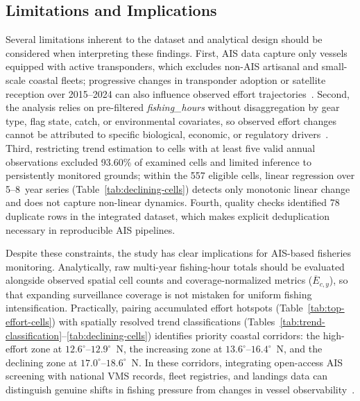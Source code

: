 \documentclass[pdflatex,sn-mathphys-num]{sn-jnl}
\theoremstyle{thmstyleone}
\theoremstyle{thmstyletwo}
\theoremstyle{thmstylethree}
\begin{document}
\subsection{Limitations and Implications}\label{subsec:disc-limitations}

Several limitations inherent to the dataset and analytical design should be considered when interpreting these findings. First, AIS data capture only vessels equipped with active transponders, which excludes non-AIS artisanal and small-scale coastal fleets; progressive changes in transponder adoption or satellite reception over 2015--2024 can also influence observed effort trajectories~\cite{taconet2019,murua2019,russo2016,gfw2025}. Second, the analysis relies on pre-filtered \textit{fishing\_hours} without disaggregation by gear type, flag state, catch, or environmental covariates, so observed effort changes cannot be attributed to specific biological, economic, or regulatory drivers~\cite{natale2015,guiet2019,taconet2019}. Third, restricting trend estimation to cells with at least five valid annual observations excluded 93.60\% of examined cells and limited inference to persistently monitored grounds; within the 557 eligible cells, linear regression over 5--8~year series (Table~\ref{tab:declining-cells}) detects only monotonic linear change and does not capture non-linear dynamics. Fourth, quality checks identified 78 duplicate rows in the integrated dataset, which makes explicit deduplication necessary in reproducible AIS pipelines.

Despite these constraints, the study has clear implications for AIS-based fisheries monitoring. Analytically, raw multi-year fishing-hour totals should be evaluated alongside observed spatial cell counts and coverage-normalized metrics ($\overline{E}_{c,y}$), so that expanding surveillance coverage is not mistaken for uniform fishing intensification. Practically, pairing accumulated effort hotspots (Table~\ref{tab:top-effort-cells}) with spatially resolved trend classifications (Tables~\ref{tab:trend-classification}--\ref{tab:declining-cells}) identifies priority coastal corridors: the high-effort zone at $12.6^\circ$--$12.9^\circ$~N, the increasing zone at $13.6^\circ$--$16.4^\circ$~N, and the declining zone at $17.0^\circ$--$18.6^\circ$~N. In these corridors, integrating open-access AIS screening with national VMS records, fleet registries, and landings data can distinguish genuine shifts in fishing pressure from changes in vessel observability~\cite{natale2015,russo2016,utama2021,welch2022}.
\end{document}
